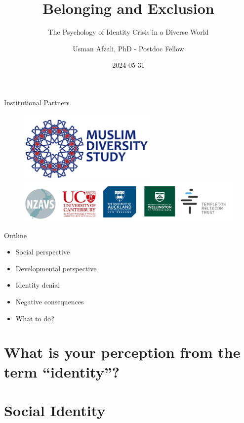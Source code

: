\documentclass[
  ignorenonframetext,
  aspectratio=169,
]{beamer}
\title{Belonging and Exclusion}
\subtitle{The Psychology of Identity Crisis in a Diverse World}
\author{Usman Afzali, PhD - Postdoc Fellow}
\date{2024-05-31}
\institute{Uni of Canterbury}
\providecommand{\tightlist}{%
  \setlength{\itemsep}{0pt}\setlength{\parskip}{0pt}}\usepackage{longtable,booktabs,array}
\begin{document}
\frame{\titlepage}

\begin{frame}{Institutional Partners}
\label{institutional-partners}
\begin{figure}

\begin{minipage}{\linewidth}
\begin{center}
\includegraphics[width=0.6\textwidth,height=\textheight]{mds.png}
\end{center}
\includegraphics{sponsors.png}\end{minipage}%

\end{figure}%
\end{frame}

\begin{frame}{Outline}
\label{outline}
\begin{itemize}
\tightlist
\item
  Social perspective
\item
  Developmental perspective
\item
  Identity denial
\item
  Negative consequences
\item
  What to do?
\end{itemize}
\end{frame}

\section{What is your perception from the term
``identity''?}\label{what-is-your-perception-from-the-term-identity}

\section{Social Identity}\label{social-identity}
\end{document}

